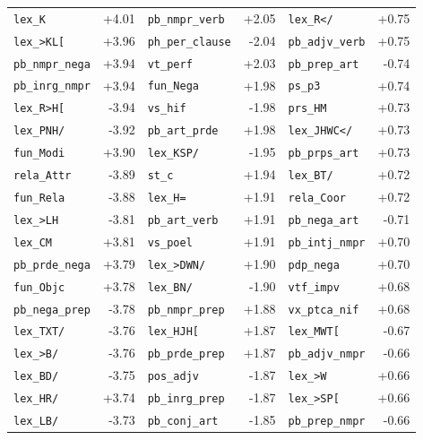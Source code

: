 \begin{longtable}{lrlrlr}
\texttt{lex\_K} & +4.01 & \texttt{pb\_nmpr\_verb} & +2.05 & \texttt{lex\_R\textless{}/} & +0.75 \\
\texttt{lex\_\textgreater{}KL[} & +3.96 & \texttt{ph\_per\_clause} & -2.04 & \texttt{pb\_adjv\_verb} & +0.75 \\
\texttt{pb\_nmpr\_nega} & +3.94 & \texttt{vt\_perf} & +2.03 & \texttt{pb\_prep\_art} & -0.74 \\
\texttt{pb\_inrg\_nmpr} & +3.94 & \texttt{fun\_Nega} & +1.98 & \texttt{ps\_p3} & +0.74 \\
\texttt{lex\_R\textgreater{}H[} & -3.94 & \texttt{vs\_hif} & -1.98 & \texttt{prs\_HM} & +0.73 \\
\texttt{lex\_PNH/} & -3.92 & \texttt{pb\_art\_prde} & +1.98 & \texttt{lex\_JHWC\textless{}/} & +0.73 \\
\texttt{fun\_Modi} & +3.90 & \texttt{lex\_KSP/} & -1.95 & \texttt{pb\_prps\_art} & +0.73 \\
\texttt{rela\_Attr} & -3.89 & \texttt{st\_c} & +1.94 & \texttt{lex\_BT/} & +0.72 \\
\texttt{fun\_Rela} & -3.88 & \texttt{lex\_H=} & +1.91 & \texttt{rela\_Coor} & +0.72 \\
\texttt{lex\_\textgreater{}LH} & -3.81 & \texttt{pb\_art\_verb} & +1.91 & \texttt{pb\_nega\_art} & -0.71 \\
\texttt{lex\_CM} & +3.81 & \texttt{vs\_poel} & +1.91 & \texttt{pb\_intj\_nmpr} & +0.70 \\
\texttt{pb\_prde\_nega} & +3.79 & \texttt{lex\_\textgreater{}DWN/} & +1.90 & \texttt{pdp\_nega} & +0.70 \\
\texttt{fun\_Objc} & +3.78 & \texttt{lex\_BN/} & -1.90 & \texttt{vtf\_impv} & +0.68 \\
\texttt{pb\_nega\_prep} & -3.78 & \texttt{pb\_nmpr\_prep} & +1.88 & \texttt{vx\_ptca\_nif} & +0.68 \\
\texttt{lex\_TXT/} & -3.76 & \texttt{lex\_HJH[} & +1.87 & \texttt{lex\_MWT[} & -0.67 \\
\texttt{lex\_\textgreater{}B/} & -3.76 & \texttt{pb\_prde\_prep} & +1.87 & \texttt{pb\_adjv\_nmpr} & -0.66 \\
\texttt{lex\_BD/} & -3.75 & \texttt{pos\_adjv} & -1.87 & \texttt{lex\_\textgreater{}W} & +0.66 \\
\texttt{lex\_HR/} & +3.74 & \texttt{pb\_inrg\_prep} & -1.87 & \texttt{lex\_\textgreater{}SP[} & +0.66 \\
\texttt{lex\_LB/} & -3.73 & \texttt{pb\_conj\_art} & -1.85 & \texttt{pb\_prep\_nmpr} & -0.66 \\

\end{longtable}
